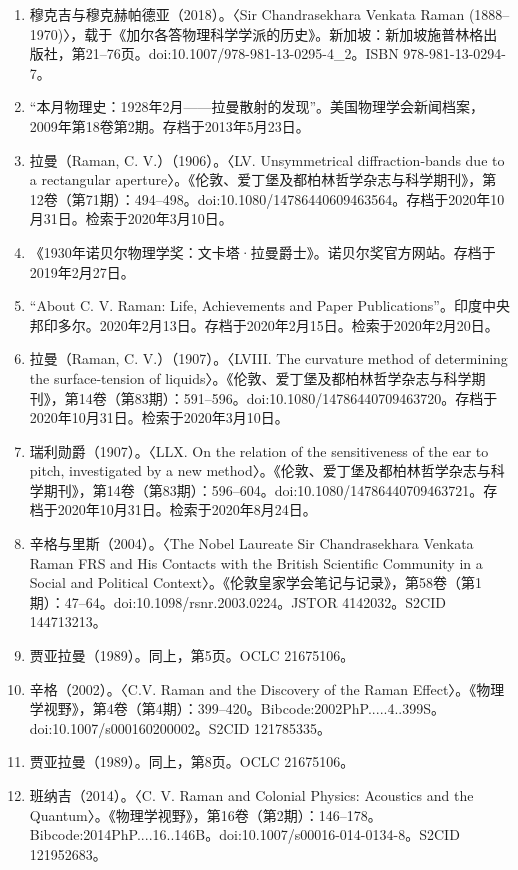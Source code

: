 \begin{enumerate}
\item 穆克吉与穆克赫帕德亚（2018）。〈Sir Chandrasekhara Venkata Raman (1888–1970)〉，载于《加尔各答物理科学学派的历史》。新加坡：新加坡施普林格出版社，第21–76页。doi:10.1007/978-981-13-0295-4_2。ISBN 978-981-13-0294-7。
\item “本月物理史：1928年2月——拉曼散射的发现”。美国物理学会新闻档案，2009年第18卷第2期。存档于2013年5月23日。
\item 拉曼（Raman, C. V.）（1906）。〈LV. Unsymmetrical diffraction-bands due to a rectangular aperture〉。《伦敦、爱丁堡及都柏林哲学杂志与科学期刊》，第12卷（第71期）：494–498。doi:10.1080/14786440609463564。存档于2020年10月31日。检索于2020年3月10日。
\item 《1930年诺贝尔物理学奖：文卡塔·拉曼爵士》。诺贝尔奖官方网站。存档于2019年2月27日。
\item “About C. V. Raman: Life, Achievements and Paper Publications”。印度中央邦印多尔。2020年2月13日。存档于2020年2月15日。检索于2020年2月20日。
\item 拉曼（Raman, C. V.）（1907）。〈LVIII. The curvature method of determining the surface-tension of liquids〉。《伦敦、爱丁堡及都柏林哲学杂志与科学期刊》，第14卷（第83期）：591–596。doi:10.1080/14786440709463720。存档于2020年10月31日。检索于2020年3月10日。
\item 瑞利勋爵（1907）。〈LLX. On the relation of the sensitiveness of the ear to pitch, investigated by a new method〉。《伦敦、爱丁堡及都柏林哲学杂志与科学期刊》，第14卷（第83期）：596–604。doi:10.1080/14786440709463721。存档于2020年10月31日。检索于2020年8月24日。
\item 辛格与里斯（2004）。〈The Nobel Laureate Sir Chandrasekhara Venkata Raman FRS and His Contacts with the British Scientific Community in a Social and Political Context〉。《伦敦皇家学会笔记与记录》，第58卷（第1期）：47–64。doi:10.1098/rsnr.2003.0224。JSTOR 4142032。S2CID 144713213。
\item 贾亚拉曼（1989）。同上，第5页。OCLC 21675106。
\item 辛格（2002）。〈C.V. Raman and the Discovery of the Raman Effect〉。《物理学视野》，第4卷（第4期）：399–420。Bibcode:2002PhP.....4..399S。doi:10.1007/s000160200002。S2CID 121785335。
\item 贾亚拉曼（1989）。同上，第8页。OCLC 21675106。
\item 班纳吉（2014）。〈C. V. Raman and Colonial Physics: Acoustics and the Quantum〉。《物理学视野》，第16卷（第2期）：146–178。Bibcode:2014PhP....16..146B。doi:10.1007/s00016-014-0134-8。S2CID 121952683。

\end{enumerate}
